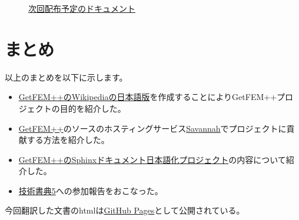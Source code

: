 \documentclass{../../style/ltjoc}
\begin{document}
\begin{figure}[htbp]
\centering
{}
\caption{\href{https://techbookfest.org}{次回配布予定のドキュメント}}
\label{fig:tecbookfest6-book}
\end{figure}
\section{まとめ}
以上のまとめを以下に示します。
\begin{itemize}
  \item{\href{https://ja.wikipedia.org/wiki/GetFEM++}{GetFEM++のWikipediaの日本語版}を作成することによりGetFEM++プロジェクトの目的を紹介した。}
  \item{\href{http://getfem.org}{GetFEM++}のソースのホスティングサービス\href{https://savannah.gnu.org}{Savannah}でプロジェクトに貢献する方法を紹介した。}
  \item{\href{http://www.sphinx-doc.org/ja/stable/intl.html}{GetFEM++のSphinxドキュメント日本語化プロジェクト}の内容について紹介した。}
  \item{\href{https://techbookfest.org/event/tbf05}{技術書典5}への参加報告をおこなった。}
\end{itemize}
今回翻訳した文書のhtmlは\href{https://tkoyama010.github.io/getfem-docs-html-ja}{GitHub Pages}として公開されている。
\end{document}
